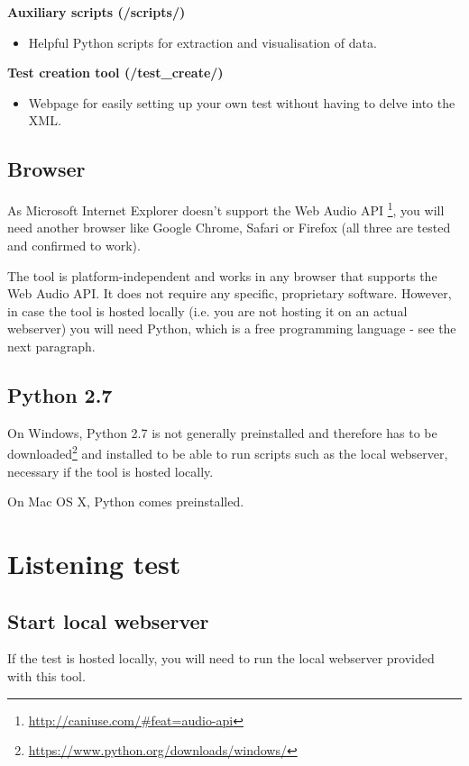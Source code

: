 \documentclass[11pt, oneside]{article}   	%
\begin{document}
                  \textbf{Auxiliary scripts (/scripts/)}
                    	\begin{itemize}
                    	\item Helpful Python scripts for extraction and visualisation of data.\\ \end{itemize}
                  \textbf{Test creation tool (/test\_create/)}
                    	\begin{itemize}
                    	\item Webpage for easily setting up your own test without having to delve into the XML.\\ \end{itemize}
                    	
	\subsection{Browser}
		As Microsoft Internet Explorer doesn't support the Web Audio API \footnote{\url{http://caniuse.com/\#feat=audio-api}}, you will need another browser like Google Chrome, Safari or Firefox (all three are tested and confirmed to work). 
		
		The tool is platform-independent and works in any browser that supports the Web Audio API. It does not require any specific, proprietary software. However, in case the tool is hosted locally (i.e. you are not hosting it on an actual webserver) you will need Python, which is a free programming language - see the next paragraph. 
	
	\subsection{Python 2.7}
		On Windows, Python 2.7 is not generally preinstalled and therefore has to be downloaded\footnote{\url{https://www.python.org/downloads/windows/}} and installed to be able to run scripts such as the local webserver, necessary if the tool is hosted locally. 
		
		On Mac OS X, Python comes preinstalled. 


\section{Listening test}
	\subsection{Start local webserver}
		If the test is hosted locally, you will need to run the local webserver provided with this tool. 
		
\end{document}
